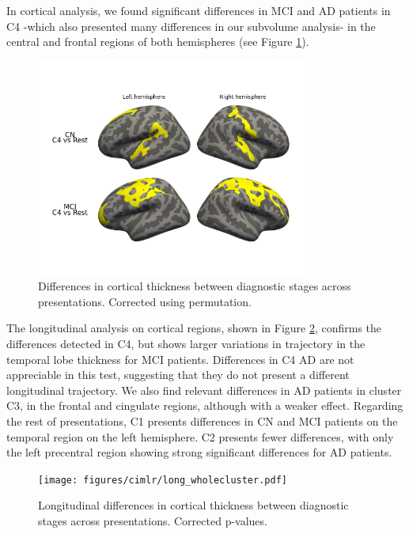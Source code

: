 In cortical analysis, we found significant differences in MCI and AD patients in C4 -which also presented many differences in our subvolume analysis- in the central and frontal regions of both hemispheres (see Figure \ref{dxcluster_againstrest_cort}). \\

\begin{figure}[!htbp]
\centering
\includegraphics[width=0.8\textwidth]{figures/cimlr/ex4_cort.png}
\caption[Diagnostic interaction analysis, cortical thickness.]{Differences in cortical thickness between diagnostic stages across presentations. Corrected using permutation.}
\label{dxcluster_againstrest_cort}
\end{figure}

The longitudinal analysis on cortical regions, shown in Figure \ref{long_diagnostic_interaction}, confirms the differences detected in C4, but shows larger variations in trajectory in the temporal lobe thickness for MCI patients. Differences in C4 AD are not appreciable in this test, suggesting that they do not present a different longitudinal trajectory. We also find relevant differences in AD patients in cluster C3, in the frontal and cingulate regions, although with a weaker effect. Regarding the rest of presentations, C1 presents differences in CN and MCI patients on the temporal region on the left hemisphere. C2 presents fewer differences, with only the left precentral region showing strong significant differences for AD patients.

\begin{figure}[!htbp]
\centering
\texttt{[image: figures/cimlr/long\_wholecluster.pdf]}
\caption[Longitudinal diagnostic interaction analysis, cortical thickness.]{Longitudinal differences in cortical thickness between diagnostic stages across presentations. Corrected p-values.}
\label{long_diagnostic_interaction}
\end{figure}

